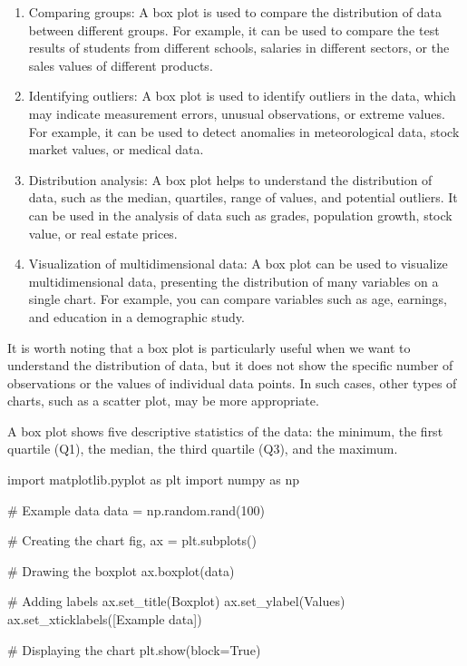 \documentclass[
  english,
  letterpaper,
  DIV=11,
  numbers=noendperiod]{scrreprt}
\newenvironment{Shaded}{\begin{snugshade}}{\end{snugshade}}
\newcommand{\CommentTok}[1]{\textcolor[rgb]{0.37,0.37,0.37}{#1}}
\newcommand{\DecValTok}[1]{\textcolor[rgb]{0.68,0.00,0.00}{#1}}
\newcommand{\ImportTok}[1]{\textcolor[rgb]{0.00,0.46,0.62}{#1}}
\newcommand{\NormalTok}[1]{\textcolor[rgb]{0.00,0.23,0.31}{#1}}
\newcommand{\OperatorTok}[1]{\textcolor[rgb]{0.37,0.37,0.37}{#1}}
\newcommand{\StringTok}[1]{\textcolor[rgb]{0.13,0.47,0.30}{#1}}
\newcommand{\VariableTok}[1]{\textcolor[rgb]{0.07,0.07,0.07}{#1}}
\begin{document}
\begin{enumerate}
\def\labelenumi{\arabic{enumi}.}
\item
  Comparing groups: A box plot is used to compare the distribution of
  data between different groups. For example, it can be used to compare
  the test results of students from different schools, salaries in
  different sectors, or the sales values of different products.
\item
  Identifying outliers: A box plot is used to identify outliers in the
  data, which may indicate measurement errors, unusual observations, or
  extreme values. For example, it can be used to detect anomalies in
  meteorological data, stock market values, or medical data.
\item
  Distribution analysis: A box plot helps to understand the distribution
  of data, such as the median, quartiles, range of values, and potential
  outliers. It can be used in the analysis of data such as grades,
  population growth, stock value, or real estate prices.
\item
  Visualization of multidimensional data: A box plot can be used to
  visualize multidimensional data, presenting the distribution of many
  variables on a single chart. For example, you can compare variables
  such as age, earnings, and education in a demographic study.
\end{enumerate}

It is worth noting that a box plot is particularly useful when we want
to understand the distribution of data, but it does not show the
specific number of observations or the values of individual data points.
In such cases, other types of charts, such as a scatter plot, may be
more appropriate.

A box plot shows five descriptive statistics of the data: the minimum,
the first quartile (Q1), the median, the third quartile (Q3), and the
maximum.

\begin{Shaded}
\begin{Highlighting}[]
\ImportTok{import}\NormalTok{ matplotlib.pyplot }\ImportTok{as}\NormalTok{ plt}
\ImportTok{import}\NormalTok{ numpy }\ImportTok{as}\NormalTok{ np}

\CommentTok{\# Example data}
\NormalTok{data }\OperatorTok{=}\NormalTok{ np.random.rand(}\DecValTok{100}\NormalTok{)}

\CommentTok{\# Creating the chart}
\NormalTok{fig, ax }\OperatorTok{=}\NormalTok{ plt.subplots()}

\CommentTok{\# Drawing the boxplot}
\NormalTok{ax.boxplot(data)}

\CommentTok{\# Adding labels}
\NormalTok{ax.set\_title(}\StringTok{\textquotesingle{}Boxplot\textquotesingle{}}\NormalTok{)}
\NormalTok{ax.set\_ylabel(}\StringTok{\textquotesingle{}Values\textquotesingle{}}\NormalTok{)}
\NormalTok{ax.set\_xticklabels([}\StringTok{\textquotesingle{}Example data\textquotesingle{}}\NormalTok{])}

\CommentTok{\# Displaying the chart}
\NormalTok{plt.show(block}\OperatorTok{=}\VariableTok{True}\NormalTok{)}
\end{Highlighting}
\end{Shaded}
\end{document}
